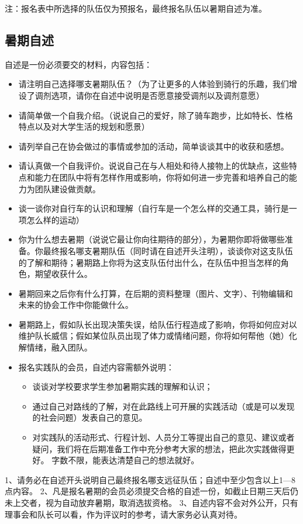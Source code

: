 \documentclass{ctexbook}
\begin{document}
注：报名表中所选择的队伍仅为预报名，最终报名队伍以暑期自述为准。
\subsection{暑期自述}
自述是一份必须要交的材料，内容包括：
\begin{itemize}
    \item 请注明自己选择哪支暑期队伍？（为了让更多的人体验到骑行的乐趣，我们增设了调剂选项，请你在自述中说明是否愿意接受调剂以及调剂意愿）
    \item 请简单做一个自我介绍。（说说自己的爱好，除了骑车跑步，比如特长、性格特点以及对大学生活的规划和愿景）
    \item 请列举自己在协会做过的事情或参加的活动，简单谈谈其中的收获和感想。
    \item 请认真做一个自我评价。说说自己在与人相处和待人接物上的优缺点，这些特点和能力在团队中将有怎样作用或影响，你将如何进一步完善和培养自己的能力为团队建设做贡献。
    \item 谈一谈你对自行车的认识和理解（自行车是一个怎么样的交通工具，骑行是一项怎么样的运动）
    \item 你为什么想去暑期（说说它最让你向往期待的部分），为暑期你即将做哪些准备。你最终报名哪支暑期队伍（同时请在自述开头注明），谈谈你对这支队伍的了解和期待；暑期路上你将为这支队伍付出什么，在队伍中担当怎样的角色，期望收获什么。
    \item 暑期回来之后你有什么打算，在后期的资料整理（图片、文字）、刊物编辑和未来的协会工作中你能做什么。
    \item 暑期路上，假如队长出现决策失误，给队伍行程造成了影响，你将如何应对以维护队长威信；假如某位队员出现了体力或情绪问题，你将如何帮他（她）化解情绪，融入团队。
    \item 报名实践队的会员，自述内容需额外说明：
    \begin{itemize}
        \item 谈谈对学校要求学生参加暑期实践的理解和认识；
        \item 通过自己对路线的了解，对在此路线上可开展的实践活动（或是可以发现的社会问题）发表自己的意见。
        \item 对实践队的活动形式、行程计划、人员分工等提出自己的意见、建议或者疑问，我们将在后期准备工作中充分参考大家的想法，把此次实践做得更好。 
字数不限，能表达清楚自己的想法就好。
    \end{itemize}
\end{itemize}
1、请务必在自述开头说明自己最终报名哪支远征队伍；自述中至少包含以上1—8点内容。
2、凡是报名暑期的会员必须提交合格的自述一份，如截止日期三天后仍未上交者，视为自动放弃暑期，取消选拔资格。
3、自述内容不会对外公开，只有理事会和队长可以看，作为评议时的参考，请大家务必认真对待。
\end{document}
